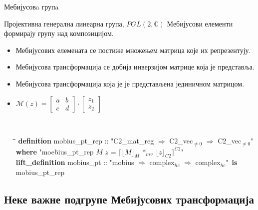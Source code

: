 \documentclass[slidestop, compress, mathserif, containsverbatim, xcolor=dvipsnames]{beamer}
\newcommand{\Repnzv}[1]{\ensuremath{\lfloor#1\rfloor_{C2}}}
\newcommand{\Absnzv}[1]{\ensuremath{\lceil#1\rceil^{C2}}}
\newcommand{\Reprm}[1]{\ensuremath{\lfloor#1\rfloor_{M}}}
\begin{document}
\begin{frame}{Мебијусовa групa}
  \begin{block}{Пројективна генерална линеарна група, $PGL(2, \mathbb{C})$}
     Мебијусови елементи формирају групу над композицијом.
   \end{block}
  \begin{itemize}
  \item {} Мебијусових елемената се постиже
    множењем матрица које их репрезентују.
  \item {} Мебијусова трансформација се добија
    инверзијом матрице која је представља.
  \item Мебијусова трансформација која је  је
    представљена јединичном матрицом.
  \item {} $\mathcal{M}(z) = \begin{bmatrix} a & b \\ c & d \end{bmatrix} \cdot \begin{bmatrix} z_1 \\ z_2 \end{bmatrix}$
    \begin{footnotesize}
    {\tt
      \begin{tabbing}
        \hspace{5mm}\=\hspace{5mm}\=\hspace{5mm}\=\hspace{5mm}\=\hspace{5mm}\=\kill
        {\bf definition} mobius\_pt\_rep :: "{}C2\_mat\_reg $\Rightarrow$ C2\_vec$_{\neq 0}$ $\Rightarrow$ C2\_vec$_{\neq 0}$"  \\
        \> {\bf where} "{}moe\=bius\_pt\_rep $M$ $z$ = $\Absnzv{\Reprm{M}\ *_{mv}\ \Repnzv{z}}$"\\
      {\bf lift\_definition} mobius\_pt :: "{}mobius $\Rightarrow$ complex$_{hc}$ $\Rightarrow$ complex$_{hc}$"\ {\bf is}\\
      \> mobius\_pt\_rep
      \end{tabbing}
      }
    \end{footnotesize}
  \end{itemize}
\end{frame}

\subsection*{Неке важне подгрупе Мебијусових трансформација}
\end{document}
